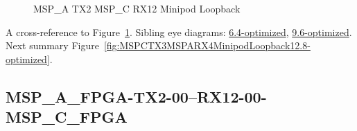\begin{figure}[h]
\begin{subfigure}{0.33\textwidth}
\hyperref[sec:MSPAFPGATX206RX1206MSPCFPGA12.8-optimized]{}
\end{subfigure}\hspace*{\fill}
\begin{subfigure}{0.33\textwidth}
\hyperref[sec:MSPAFPGATX207RX1207MSPCFPGA12.8-optimized]{}
\end{subfigure}\hspace*{\fill}
\begin{subfigure}{0.33\textwidth}
\hyperref[sec:MSPAFPGATX208RX1208MSPCFPGA12.8-optimized]{}
\end{subfigure}

\begin{subfigure}{0.33\textwidth}
\hyperref[sec:MSPAFPGATX209RX1209MSPCFPGA12.8-optimized]{}
\end{subfigure}\hspace*{\fill}
\begin{subfigure}{0.33\textwidth}
\hyperref[sec:MSPAFPGATX210RX1210MSPCFPGA12.8-optimized]{}
\end{subfigure}\hspace*{\fill}
\begin{subfigure}{0.33\textwidth}
\hyperref[sec:MSPAFPGATX211RX1211MSPCFPGA12.8-optimized]{}
\end{subfigure}

\caption{MSP\_A TX2 MSP\_C RX12 Minipod Loopback} \label{fig:MSPATX2MSPCRX12MinipodLoopback12.8-optimized}
\end{figure}

A cross-reference to Figure~\ref{fig:MSPATX2MSPCRX12MinipodLoopback12.8-optimized}.
Sibling eye diagrams: \hyperref[sec:MSPATX2MSPCRX12MinipodLoopback6.4-optimized]{6.4-optimized}, \hyperref[sec:MSPATX2MSPCRX12MinipodLoopback9.6-optimized]{9.6-optimized}. \\
Next summary Figure~\ref{fig:MSPCTX3MSPARX4MinipodLoopback12.8-optimized}.
\clearpage
% 
\subsection{MSP\_A\_FPGA-TX2-00--RX12-00-MSP\_C\_FPGA}\label{sec:MSPAFPGATX200RX1200MSPCFPGA12.8-optimized}

